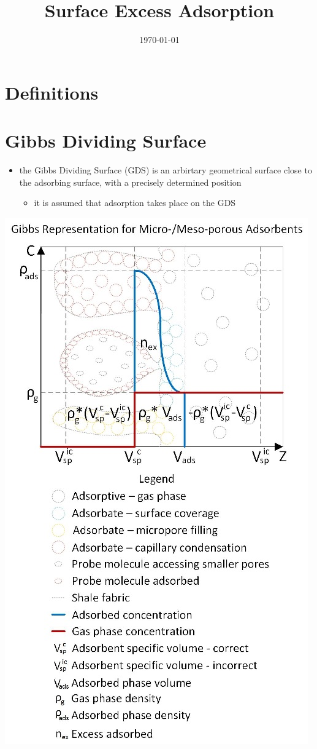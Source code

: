 \documentclass[11pt]{article}
\date{\today}
\title{Surface Excess Adsorption}
\begin{document}
\maketitle
\tableofcontents


\section{Definitions}
\label{sec:orgb397f16}

\section{Gibbs Dividing Surface}
\label{sec:org84c55be}
\begin{itemize}
\item the Gibbs Dividing Surface (GDS) is an arbirtary geometrical surface close to the adsorbing surface, with a precisely determined position
\begin{itemize}
\item it is assumed that adsorption takes place on the GDS
\end{itemize}
\end{itemize}

\begin{center}
\includegraphics[width=.9\linewidth]{./gibbsrepresentation.jpg}
\end{center}
\cite{Rouquerol2016}
\end{document}
